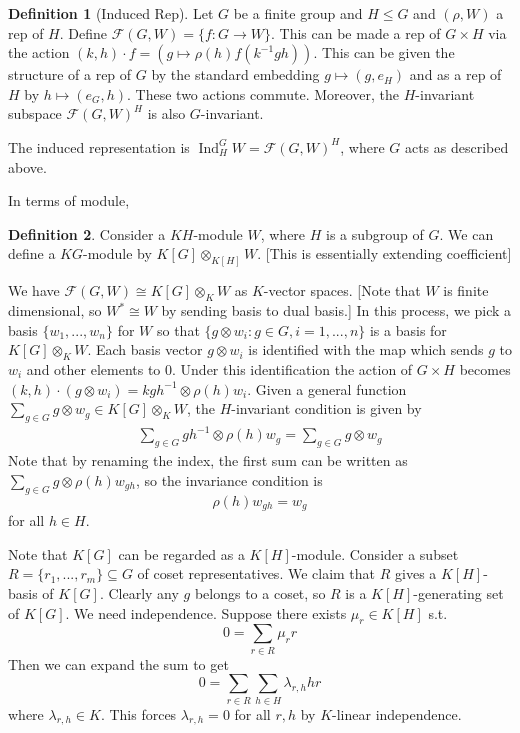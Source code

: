 \documentclass{article}
\theoremstyle{definition}
\newtheorem{defn}{Definition}[section]
\theoremstyle{remark}
\theoremstyle{plain}
\begin{document}
\begin{defn}[Induced Rep]
Let $G$ be a finite group and $H\le G$ and $(\rho, W)$ a rep of $H$.
Define $\mathcal{F}(G,W)=\{f:G\to W\}$. This can be made a rep of $G\times H$ via the action $(k,h)\cdot f=(g\mapsto \rho(h)f(k^{-1}gh))$. This can be given the structure of a rep of $G$ by the standard embedding $g\mapsto (g,e_H)$ and as a rep of $H$ by $h\mapsto(e_G,h)$. These two actions commute. Moreover, the $H$-invariant subspace $\mathcal{F}(G,W)^H$ is also $G$-invariant.
    
    The induced representation is $\operatorname{Ind}_H^GW=\mathcal{F}(G,W)^H$, where $G$ acts as described above.
\end{defn}
In terms of module,
\begin{defn}
    Consider a $KH$-module $W$, where $H$ is a subgroup of $G$. We can define a $KG$-module by $K[G]\otimes_{K[H]}W$. [This is essentially extending coefficient]
\end{defn}
We have $\mathcal{F}(G,W)\cong K[G]\otimes_K W$ as $K$-vector spaces. [Note that $W$ is finite dimensional, so $W^\ast\cong W$ by sending basis to dual basis.] In this process, we pick a basis $\{w_1,...,w_n\}$ for $W$ so that $\{g\otimes w_i:g\in G, i=1,...,n\}$ is a basis for $K[G]\otimes_K W$. Each basis vector $g\otimes w_i$ is identified with the map which sends $g$ to $w_i$ and other elements to $0$. Under this identification the action of $G\times H$ becomes $(k,h)\cdot (g\otimes w_i)=kgh^{-1}\otimes\rho(h)w_i$. Given a general function $\sum_{g\in G} g\otimes w_g\in K[G]\otimes_KW$, the $H$-invariant condition is given by
\begin{align*}
    \sum_{g\in G}gh^{-1}\otimes \rho(h)w_g=\sum_{g\in G}g\otimes w_g
\end{align*}
Note that by renaming the index, the first sum can be written as $\sum_{g\in G}g\otimes \rho(h)w_{gh}$, so the invariance condition is
\[\rho(h)w_{gh}=w_g\] for all  $h\in H$.

Note that $K[G]$ can be regarded as a $K[H]$-module. Consider a subset $R=\{r_1,...,r_m\}\subseteq G$ of coset representatives. We claim that $R$ gives a $K[H]$-basis of $K[G]$. Clearly any $g$ belongs to a coset, so $R$ is a $K[H]$-generating set of $K[G]$. We need independence. Suppose there exists $\mu_r\in K[H]$ s.t.
\[0=\sum_{r\in R}\mu_rr\]
Then we can expand the sum to get
\[0=\sum_{r\in R}\sum_{h\in H}\lambda_{r,h}hr\]
where $\lambda_{r,h}\in K$. This forces $\lambda_{r,h}=0$ for all $r,h$ by $K$-linear independence.
\end{document}
